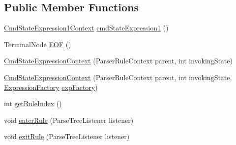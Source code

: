 \subsection*{Public Member Functions}
\begin{DoxyCompactItemize}
\item 
\hyperlink{classgov_1_1nasa_1_1jpf_1_1inspector_1_1server_1_1expression_1_1parser_1_1_expression_grammar_pa1eb341e049a8047f26aa8b84266a8b94}{Cmd\+State\+Expression1\+Context} \hyperlink{classgov_1_1nasa_1_1jpf_1_1inspector_1_1server_1_1expression_1_1parser_1_1_expression_grammar_pa37db371aaa956234112b7f14e4ab3f14_aca8d81a1b5d8a0ed047518f8742b6111}{cmd\+State\+Expression1} ()
\item 
Terminal\+Node \hyperlink{classgov_1_1nasa_1_1jpf_1_1inspector_1_1server_1_1expression_1_1parser_1_1_expression_grammar_pa37db371aaa956234112b7f14e4ab3f14_ac5cdd6e5577f442376c6e893d7ea2e3b}{E\+OF} ()
\item 
\hyperlink{classgov_1_1nasa_1_1jpf_1_1inspector_1_1server_1_1expression_1_1parser_1_1_expression_grammar_pa37db371aaa956234112b7f14e4ab3f14_ab41ddd0d4f62d9838aabf83d8dacccb2}{Cmd\+State\+Expression\+Context} (Parser\+Rule\+Context parent, int invoking\+State)
\item 
\hyperlink{classgov_1_1nasa_1_1jpf_1_1inspector_1_1server_1_1expression_1_1parser_1_1_expression_grammar_pa37db371aaa956234112b7f14e4ab3f14_afb753b4e2329a0b80a9dbf96efa11120}{Cmd\+State\+Expression\+Context} (Parser\+Rule\+Context parent, int invoking\+State, \hyperlink{classgov_1_1nasa_1_1jpf_1_1inspector_1_1server_1_1expression_1_1_expression_factory}{Expression\+Factory} \hyperlink{classgov_1_1nasa_1_1jpf_1_1inspector_1_1server_1_1expression_1_1parser_1_1_expression_grammar_pa37db371aaa956234112b7f14e4ab3f14_a916a26685569bdfd4dbdc9a6909e9b02}{exp\+Factory})
\item 
int \hyperlink{classgov_1_1nasa_1_1jpf_1_1inspector_1_1server_1_1expression_1_1parser_1_1_expression_grammar_pa37db371aaa956234112b7f14e4ab3f14_aec986ac29450c7415496604c4a1bf4da}{get\+Rule\+Index} ()
\item 
void \hyperlink{classgov_1_1nasa_1_1jpf_1_1inspector_1_1server_1_1expression_1_1parser_1_1_expression_grammar_pa37db371aaa956234112b7f14e4ab3f14_ac8966047ac2c736a91e187fac0c7b9bf}{enter\+Rule} (Parse\+Tree\+Listener listener)
\item 
void \hyperlink{classgov_1_1nasa_1_1jpf_1_1inspector_1_1server_1_1expression_1_1parser_1_1_expression_grammar_pa37db371aaa956234112b7f14e4ab3f14_ad500712950aba2d48ccfe4ad8de3d968}{exit\+Rule} (Parse\+Tree\+Listener listener)
\end{DoxyCompactItemize}
